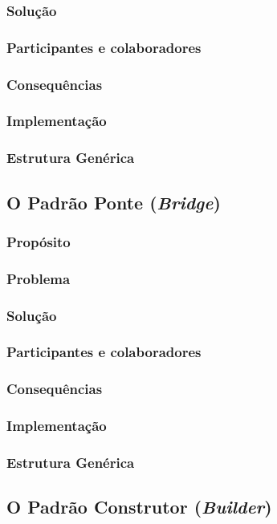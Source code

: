 \documentclass[
	11pt,				%
	openright,
	twoside,			%
	a4paper,			%
	english,			%
	french,
	brazil,				%
	sumario=tradicional
	]{abntex2}
\begin{document}
\subsubsection{Solução}
\subsubsection{Participantes e colaboradores}
\subsubsection{Consequências}
\subsubsection{Implementação}
\subsubsection{Estrutura Genérica}

\subsection{O Padrão Ponte (\textit{Bridge})}
\subsubsection{Propósito}
\subsubsection{Problema}
\subsubsection{Solução}
\subsubsection{Participantes e colaboradores}
\subsubsection{Consequências}
\subsubsection{Implementação}
\subsubsection{Estrutura Genérica}

\subsection{O Padrão Construtor (\textit{Builder})}
\end{document}

